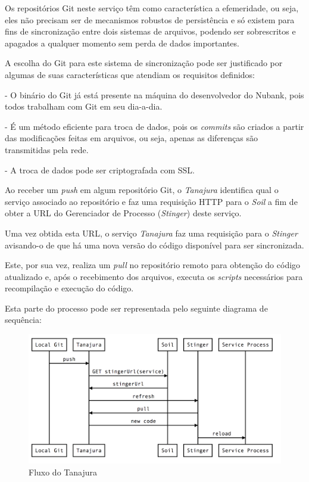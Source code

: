 	Os repositórios Git neste serviço têm como característica a efemeridade, ou seja, eles não precisam ser de mecanismos robustos de persistência e só existem para fins de sincronização entre dois sistemas de arquivos, podendo ser sobrescritos e apagados a qualquer momento sem perda de dados importantes.
	
	A escolha do Git para este sistema de sincronização pode ser justificado por algumas de suas características que atendiam os requisitos definidos:
	
	- O binário do Git já está presente na máquina do desenvolvedor do Nubank, pois todos trabalham com Git em seu dia-a-dia.
	
	- É um método eficiente para troca de dados, pois os \textit{commits} são criados a partir das modificações feitas em arquivos, ou seja, apenas as diferenças são transmitidas pela rede.
	
	- A troca de dados pode ser criptografada com SSL.

	Ao receber um \textit{push} em algum repositório Git, o \textit{Tanajura} identifica qual o serviço associado ao repositório e faz uma requisição HTTP para o \textit{Soil} a fim de obter a URL do Gerenciador de Processo (\textit{Stinger}) deste serviço.
	
	Uma vez obtida esta URL, o serviço \textit{Tanajura} faz uma requisição para o \textit{Stinger} avisando-o de que há uma nova versão do código disponível para ser sincronizada.
	
	Este, por sua vez, realiza um \textit{pull} no repositório remoto para obtenção do código atualizado e, após o recebimento dos arquivos, executa os \textit{scripts} necessários para recompilação e execução do código.
	
	Esta parte do processo pode ser representada pelo seguinte diagrama de sequência:
		\begin{figure}[htb]
			\caption{\label{fig_arquitetura2}Fluxo do Tanajura}
			\begin{center}
			\includegraphics[scale=0.29]{pictures/tanajura-flow.png}
			\end{center}
		\end{figure}

